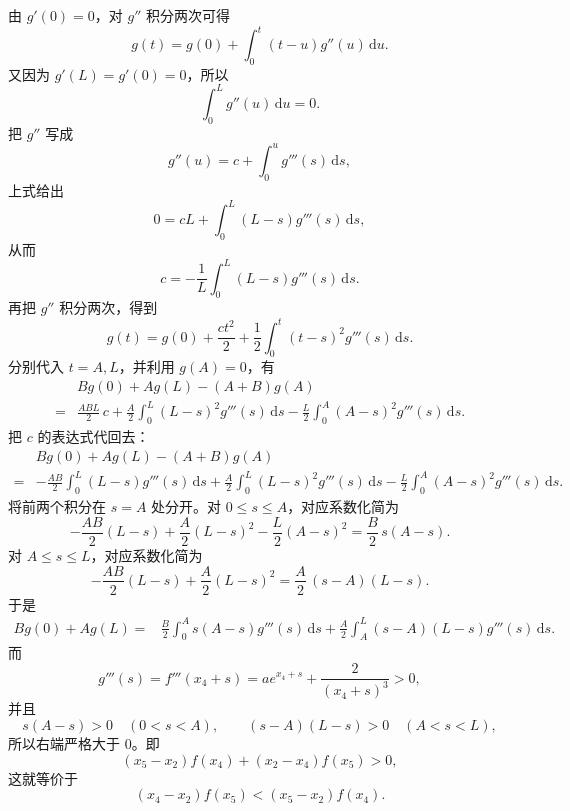 \begin{solution}
由 $g'(0)=0$，对 $g''$ 积分两次可得
\[
g(t)=g(0)+\int_0^t (t-u)g''(u)\,\mathrm{d}u.
\]
又因为 $g'(L)=g'(0)=0$，所以
\[
\int_0^L g''(u)\,\mathrm{d}u=0.
\]
把 $g''$ 写成
\[
g''(u)=c+\int_0^u g'''(s)\,\mathrm{d}s,
\]
上式给出
\[
0=cL+\int_0^L (L-s)g'''(s)\,\mathrm{d}s,
\]
从而
\[
c=-\frac1L\int_0^L (L-s)g'''(s)\,\mathrm{d}s.
\]
再把 $g''$ 积分两次，得到
\[
g(t)=g(0)+\frac{ct^2}{2}+\frac12\int_0^t (t-s)^2g'''(s)\,\mathrm{d}s.
\]
分别代入 $t=A,L$，并利用 $g(A)=0$，有
\begin{align*}
&Bg(0)+Ag(L)-(A+B)g(A)\\
=&\frac{ABL}{2}\,c+\frac A2\int_0^L (L-s)^2g'''(s)\,\mathrm{d}s-\frac L2\int_0^A (A-s)^2g'''(s)\,\mathrm{d}s.
\end{align*}
把 $c$ 的表达式代回去：
\begin{align*}
&Bg(0)+Ag(L)-(A+B)g(A)\\
=&-\frac{AB}{2}\int_0^L (L-s)g'''(s)\,\mathrm{d}s
+\frac A2\int_0^L (L-s)^2g'''(s)\,\mathrm{d}s
-\frac L2\int_0^A (A-s)^2g'''(s)\,\mathrm{d}s.
\end{align*}
将前两个积分在 $s=A$ 处分开。对 $0\le s\le A$，对应系数化简为
\[
-\frac{AB}{2}(L-s)+\frac A2(L-s)^2-\frac L2(A-s)^2
=\frac B2\,s(A-s).
\]
对 $A\le s\le L$，对应系数化简为
\[
-\frac{AB}{2}(L-s)+\frac A2(L-s)^2
=\frac A2\,(s-A)(L-s).
\]
于是
\begin{align*}
Bg(0)+Ag(L)
=&\frac B2\int_0^A s(A-s)g'''(s)\,\mathrm{d}s
+\frac A2\int_A^L (s-A)(L-s)g'''(s)\,\mathrm{d}s.
\end{align*}
而
\[
g'''(s)=f'''(x_4+s)=ae^{x_4+s}+\frac2{(x_4+s)^3}>0,
\]
并且
\[
s(A-s)>0\quad (0<s<A),\qquad (s-A)(L-s)>0\quad (A<s<L),
\]
所以右端严格大于 $0$。即
\[
(x_5-x_2)f(x_4)+(x_2-x_4)f(x_5)>0,
\]
这就等价于
\[
(x_4-x_2)f(x_5)<(x_5-x_2)f(x_4).
\]
\end{solution}

